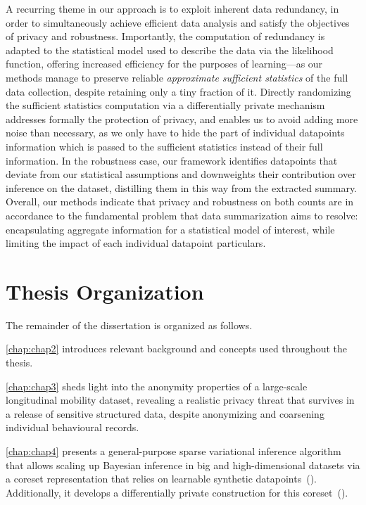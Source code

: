 A recurring theme in our approach is to exploit inherent data redundancy, in order to simultaneously achieve efficient data analysis and satisfy the objectives of privacy and robustness. Importantly, the computation of redundancy is adapted to the statistical model used to describe the data via the likelihood function, offering increased efficiency for the purposes of learning---as our methods manage to preserve reliable \emph{approximate sufficient statistics} of the full data collection, despite retaining only a tiny fraction of it. Directly randomizing the sufficient statistics computation via a differentially private mechanism addresses formally the protection of privacy, and enables us to avoid adding more noise than necessary, as we only have to hide the part of individual datapoints information which is passed to the sufficient statistics instead of their full information. In the robustness case, our framework identifies datapoints that deviate from our statistical assumptions and downweights their contribution over inference on the dataset, distilling them in this way from the extracted summary. Overall, our methods indicate that privacy and robustness on both counts are in accordance to the fundamental problem that data summarization aims to resolve: encapsulating aggregate information for a statistical model of interest, while limiting the impact of each individual datapoint particulars.


\section{Thesis Organization}
\label{sec:thesis-organization}
The remainder of the dissertation is organized as follows. 

\cref{chap:chap2} introduces relevant background and concepts used throughout the thesis. 

\cref{chap:chap3} sheds light into the anonymity properties of a large-scale longitudinal mobility dataset, revealing a realistic privacy threat that survives in a release of sensitive structured data, despite anonymizing and coarsening individual behavioural records. 

\cref{chap:chap4} presents a general-purpose sparse variational inference algorithm that allows scaling up Bayesian inference in big and high-dimensional datasets via a coreset representation that relies on learnable synthetic datapoints~(\psvi). Additionally, it develops a differentially private construction for this coreset~(\dpsvi). 

